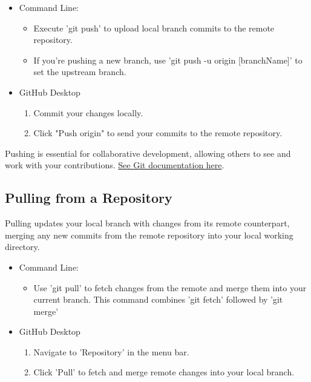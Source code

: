 \documentclass[10pt,twocolumn]{article}
\begin{document}
\begin{itemize}
    \item Command Line: 
    \begin{itemize}
        \item  Execute 'git push' to upload local branch commits to the remote repository. 
        \item If you're pushing a new branch, use 'git push -u origin [branchName]' to set the upstream branch.
    \end{itemize}
    \item GitHub Desktop
    \begin{enumerate}
        \item Commit your changes locally.
        \item Click "Push origin" to send your commits to the remote repository.
    \end{enumerate}
    
\end{itemize}

Pushing is essential for collaborative development, allowing others to see and work with your contributions. \hyperlink{https://git-scm.com/docs/git-push}{See Git documentation here}. \cite{GitPushDocumentation}\cite{GitGuidesPush}

\subsection{Pulling from a Repository}

Pulling updates your local branch with changes from its remote counterpart, merging any new commits from the remote repository into your local working directory.

\begin{itemize}
    \item Command Line: 
    \begin{itemize}
        \item  Use 'git pull' to fetch changes from the remote and merge them into your current branch. This command combines 'git fetch' followed by 'git merge' 
    \end{itemize}
    \item GitHub Desktop
    \begin{enumerate}
        \item Navigate to 'Repository' in the menu bar.
        \item Click 'Pull' to fetch and merge remote changes into your local branch.
    \end{enumerate}
    
\end{itemize}
\end{document}
